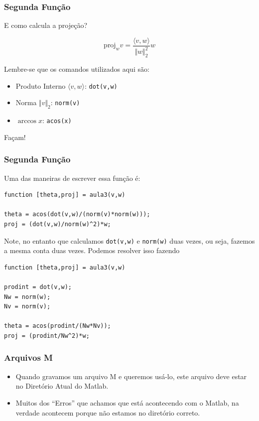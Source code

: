 \documentclass{beamer}
\newcommand{\norma}[1]{\Vert #1 \Vert_2}
\newcommand{\prodint}[2]{\langle #1,#2 \rangle}
\begin{document}
\begin{frame}
\frametitle{Segunda Fun\c{c}\~ao}

E como calcula a proje\c{c}\~ao?
\pause

$$\mbox{proj}_wv = \frac{\prodint{v}{w}}{\norma{w}^2}w$$
\pause

Lembre-se que os comandos utilizados aqui s\~ao:

\begin{itemize}
\item Produto Interno $\prodint{v}{w}$: {\tt dot(v,w)}
\item Norma $\norma{v}$: {\tt norm(v)}
\item $\arccos{x}$: {\tt acos(x)}
\end{itemize}
\pause
Fa\c{c}am!

\end{frame}

\begin{frame}[fragile]
\frametitle{Segunda Fun\c{c}\~ao}

Uma das maneiras de escrever essa fun\c{c}\~ao \'e:

{\scriptsize
\begin{verbatim}
function [theta,proj] = aula3(v,w)

theta = acos(dot(v,w)/(norm(v)*norm(w)));
proj = (dot(v,w)/norm(w)^2)*w;
\end{verbatim}
}

\pause
Note, no entanto que calculamos {\tt dot(v,w)} e {\tt norm(w)} duas vezes, ou seja, fazemos a mesma conta duas vezes. Podemos resolver isso fazendo
\pause

{\scriptsize
\begin{verbatim}
function [theta,proj] = aula3(v,w)

prodint = dot(v,w);
Nw = norm(w);
Nv = norm(v);

theta = acos(prodint/(Nw*Nv));
proj = (prodint/Nw^2)*w;
\end{verbatim}
}

\end{frame}

\begin{frame}
\frametitle{Arquivos M}

\begin{itemize}
 \item<1-> Quando gravamos um arquivo M e queremos us\'a-lo, este arquivo deve estar no Diret\'orio Atual do Matlab.
 \item<2-> Muitos dos ``Erros'' que achamos que est\'a acontecendo com o Matlab, na verdade acontecem porque n\~ao estamos no diret\'orio correto.
\end{itemize}
\end{frame}
\end{document}
